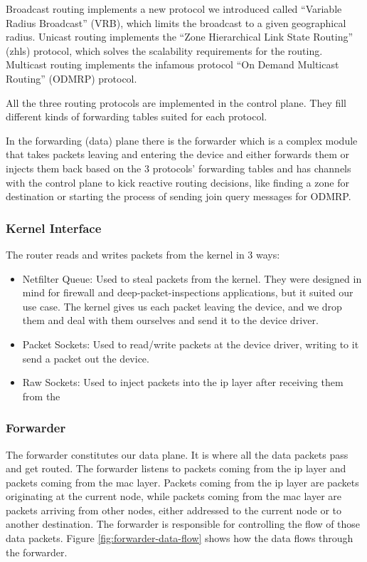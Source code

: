 Broadcast routing implements a new protocol we introduced called ``Variable Radius Broadcast'' (VRB), which limits the broadcast to a given geographical radius.
Unicast routing implements the ``Zone Hierarchical Link State Routing'' (\acrshort{zhls}) protocol, which solves the scalability requirements for the routing.
Multicast routing implements the infamous protocol ``On Demand Multicast Routing'' (ODMRP) protocol.

All the three routing protocols are implemented in the control plane.
They fill different kinds of forwarding tables suited for each protocol.

In the forwarding (data) plane there is the forwarder which is a complex module that takes packets leaving and entering the device and either forwards them or injects them back based on the 3 protocols' forwarding tables and has channels with the control plane to kick reactive routing decisions, like finding a zone for destination or starting the process of sending join query messages for ODMRP.

\subsubsection{Kernel Interface} 
The router reads and writes packets from the kernel in 3 ways:
\begin{itemize}[itemsep=1pt, topsep=5pt]
    \item Netfilter Queue: Used to steal packets from the kernel. They were designed in mind for firewall and deep-packet-inspections applications, but it suited our use case. The kernel gives us each packet leaving the device, and we drop them and deal with them ourselves and send it to the device driver.
    \item Packet Sockets: Used to read/write packets at the device driver, writing to it send a packet out the device.
    \item Raw Sockets: Used to inject packets into the \acrshort{ip} layer after receiving them from the 
\end{itemize}

\subsubsection{Forwarder}

The forwarder constitutes our data plane. It is where all the data packets pass and get routed. The forwarder listens to packets coming from the \acrshort{ip} layer and packets coming from the \acrshort{mac} layer. Packets coming from the \acrshort{ip} layer are packets originating at the current node, while packets coming from the \acrshort{mac} layer are packets arriving from other nodes, either addressed to the current node or to another destination. The forwarder is responsible for controlling the flow of those data packets. Figure \ref{fig:forwarder-data-flow} shows how the data flows through the forwarder.

